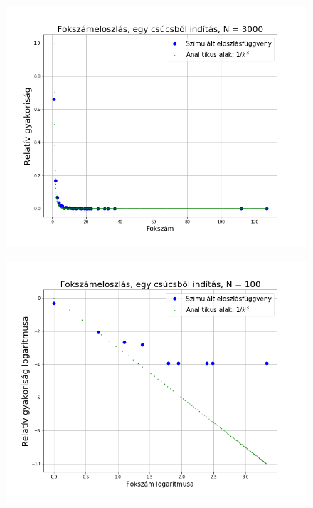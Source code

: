 \documentclass[a4paper, 12pt]{article}
\numberwithin{equation}{section}          %
\numberwithin{figure}{subsection}
\begin{document}
\begin{figure}[c!]
	\begin{center}
		\includegraphics[width=1\textwidth]{elso.png}
	\end{center}
\end{figure}



\clearpage

\begin{figure}[h!]
	\begin{center}
		\includegraphics[width=1\textwidth]{elsolog.png}
	\end{center}
\end{figure}
\clearpage
\end{document}
